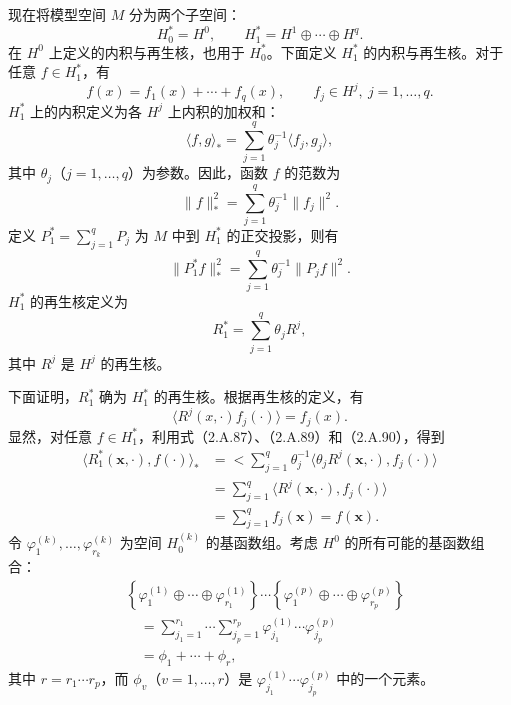 现在将模型空间 $M$ 分为两个子空间：
\begin{equation}
H_0^*=H^0,\qquad H_1^*=H^1\oplus\cdots\oplus H^q.\tag{2.A.86}
\end{equation}
在 $H^0$ 上定义的内积与再生核，也用于 $H_0^*$。下面定义 $H_1^*$ 的内积与再生核。对于任意 $f\in H_1^*$，有
\[
f(x)=f_1(x)+\cdots+f_q(x),\qquad f_j\in H^j,\ j=1,\ldots,q.
\]
$H_1^*$ 上的内积定义为各 $H^j$ 上内积的加权和：
\begin{equation}
\langle f,g\rangle_*=\sum_{j=1}^q\theta_j^{-1}
 \langle f_j,g_j\rangle,\tag{2.A.87}
\end{equation}
其中 $\theta_j$（$j=1,\ldots,q$）为参数。因此，函数 $f$ 的范数为
\[
\|f\|_*^2=\sum_{j=1}^q\theta_j^{-1}\|f_j\|^2.
\]
定义 $P_1^*=\sum_{j=1}^qP_j$ 为 $M$ 中到 $H_1^*$ 的正交投影，则有
\begin{equation}
\|P_1^*f\|_*^2=\sum_{j=1}^q\theta_j^{-1}\|P_jf\|^2.\tag{2.A.88}
\end{equation}
$H_1^*$ 的再生核定义为
\begin{equation}
R_1^*=\sum_{j=1}^q\theta_jR^j,\tag{2.A.89}
\end{equation}
其中 $R^j$ 是 $H^j$ 的再生核。

下面证明，$R_1^*$ 确为 $H_1^*$ 的再生核。根据再生核的定义，有
\begin{equation}
\langle R^j(x,\cdot)f_j(\cdot)\rangle=f_j(x).\tag{2.A.90}
\end{equation}
显然，对任意 $f\in H_1^*$，利用式（2.A.87）、（2.A.89）和（2.A.90），得到
\[
\begin{aligned}
\langle R_1^*(\boldsymbol x,\cdot),f(\cdot)\rangle_*
 &={}<\sum_{j=1}^q\theta_j^{-1}
       \langle\theta_jR^j(\boldsymbol x,\cdot),f_j(\cdot)\rangle\\
 &=\sum_{j=1}^q\langle R^j(\boldsymbol x,\cdot),f_j(\cdot)\rangle\\
 &=\sum_{j=1}^qf_j(\boldsymbol x)=f(\boldsymbol x).
\end{aligned}
\]
令 $\varphi_1^{(k)},\ldots,\varphi_{r_k}^{(k)}$ 为空间 $H_0^{(k)}$ 的基函数组。考虑 $H^0$ 的所有可能的基函数组合：
\begin{equation}
\begin{aligned}
&\left\{\varphi_1^{(1)}\oplus\cdots\oplus\varphi_{r_1}^{(1)}\right\}
 \cdots
 \left\{\varphi_1^{(p)}\oplus\cdots\oplus\varphi_{r_p}^{(p)}\right\}\\
 &\quad=\sum_{j_1=1}^{r_1}\cdots\sum_{j_p=1}^{r_p}
          \varphi_{j_1}^{(1)}\cdots\varphi_{j_p}^{(p)}\\
 &\quad=\phi_1+\cdots+\phi_r,
\end{aligned}\tag{2.A.91}
\end{equation}
其中 $r=r_1\cdots r_p$，而 $\phi_v$（$v=1,\ldots,r$）是 $\varphi_{j_1}^{(1)}\cdots\varphi_{j_p}^{(p)}$ 中的一个元素。


